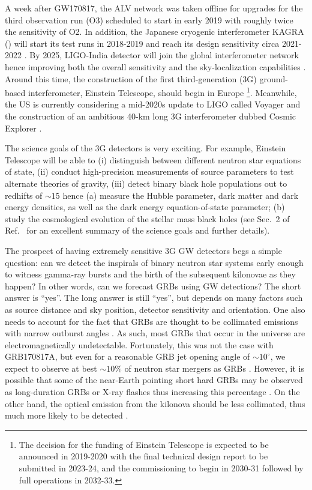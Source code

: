 \documentclass[prd,amsmath,amssymb,aps,floats,amsfonts,notitlepage,superscriptaddress,eqsecnum,nofootinbib,10pt]{revtex4-1}
\begin{document}
A week after GW170817, the ALV network was taken offline for upgrades for the third observation run (O3) 
scheduled to start in early 2019 with roughly twice the sensitivity of O2.
In addition, the Japanese cryogenic interferometer KAGRA (\cite{KAGRA, KAGRA2}) will start its test runs in 2018-2019 and reach its design sensitivity circa 2021-2022 \cite{Akutsu:2017thy, Aasi:2013wya}. By 2025, LIGO-India detector will join the global interferometer network hence improving both the overall sensitivity and the sky-localization capabilities \cite{Aasi:2013wya}.
Around this time, the construction of the first third-generation (3G) ground-based interferometer, Einstein Telescope, should begin in Europe \cite{ET_doc}\footnote{The decision for the funding of Einstein Telescope
is expected to be announced in 2019-2020 with the final technical design report to be submitted in 2023-24, and the commissioning to begin in 2030-31 followed by full operations in 2032-33.}.
Meanwhile, the US is currently considering a mid-2020s update to LIGO called Voyager \cite{LIGO_Voy} and the construction of an ambitious 40-km long 3G interferometer dubbed Cosmic Explorer \cite{CE}.

The science goals of the 3G detectors is very exciting. For example,
Einstein Telescope will be able to (i) distinguish between different neutron star equations of state, (ii) conduct high-precision measurements 
of source parameters to test alternate theories of gravity,
(iii) detect binary black hole populations out to redhifts of $\sim 15$
hence  (a) measure the Hubble parameter, dark matter and dark energy densities, as well as the dark energy equation-of-state parameter;
(b) study the cosmological evolution of the stellar mass black holes (see Sec.~2 of Ref.~\cite{ET_doc} for an excellent summary of the science goals and further details).

The prospect of having extremely sensitive 3G GW detectors begs a simple question: can we detect the inspirals of binary neutron star systems
early enough to witness gamma-ray bursts and the birth of the subsequent kilonovae as they happen? 
In other words, can we forecast GRBs using GW detections?
The short answer is ``yes''. The long answer is still ``yes'', but depends on many factors such as source distance and sky position, detector sensitivity and orientation. One also needs to account for the fact that GRBs are thought to be collimated emissions with narrow outburst angles \cite{Kumar:2014upa}.
As such, most GRBs that occur in the universe are electromagnetically undetectable. Fortunately, this was not the case with GRB170817A, 
but even for a reasonable GRB jet opening angle of $\sim 10^\circ$, we expect to observe at best $\sim 10\%$ of neutron star mergers as GRBs \cite{Patricelli:2016bkt}. 
However, it is possible that some of the near-Earth pointing short hard GRBs may be observed as long-duration GRBs or X-ray flashes thus increasing this percentage \cite{Bucciantini:2011kx}.
On the other hand, the optical emission from the kilonova should be less collimated, thus much more likely
to be detected \cite{Troja:2017nqp}.
\end{document}
